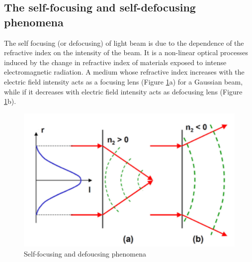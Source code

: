 \documentclass[%
 reprint,
 amsmath,amssymb,
 aps,
]{revtex4-2}
\begin{document}
	\subsection{The self-focusing and self-defocusing phenomena}
		The self focusing (or defocusing) of light beam is due to the
		dependence of the refractive index on the intensity of the beam. It is a non-linear optical processes induced by the
		change in refractive index of materials exposed to intense electromagnetic
		radiation. A medium whose refractive index increases with the electric field
		intensity acts as a focusing lens (Figure \ref{fig:focdefoc}a) for a Gaussian beam, while if it decreases with electric field intensity acts as defocusing lens (Figure \ref{fig:focdefoc}b).
		\begin{figure}
			\centering
			\includegraphics[scale = 0.7]{focdefoc}
			\caption{Self-focusing and defoucsing phenomena}
			\label{fig:focdefoc}
		\end{figure}
\end{document}
